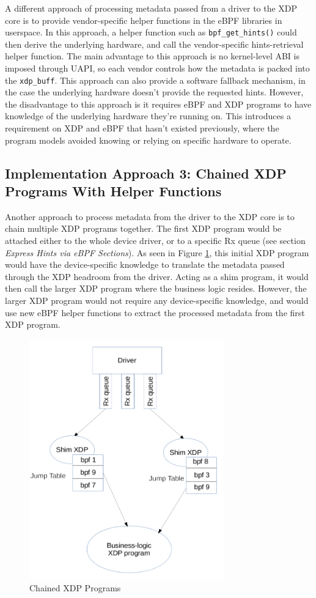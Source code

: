 \documentclass[letterpaper]{article}
\begin{document}
A different approach of processing metadata passed from a driver to the XDP core is to provide vendor-specific helper functions in the eBPF libraries in userspace. In this approach, a helper function such as {\small \texttt{bpf\_get\_hints()}} could then derive the underlying hardware, and call the vendor-specific hints-retrieval helper function. The main advantage to this approach is no kernel-level ABI is imposed through UAPI, so each vendor controls how the metadata is packed into the {\small \texttt{xdp\_buff}}. This approach can also provide a software fallback mechanism, in the case the underlying hardware doesn't provide the requested hints.
\newline
\indent However, the disadvantage to this approach is it requires eBPF and XDP programs to have knowledge of the underlying hardware they're running on. This introduces a requirement on XDP and eBPF that hasn't existed previously, where the program models avoided knowing or relying on specific hardware to operate.

\subsection{Implementation Approach 3: Chained XDP Programs With Helper Functions}

Another approach to process metadata from the driver to the XDP core is to chain multiple XDP programs together. The first XDP program would be attached either to the whole device driver, or to a specific Rx queue (see section \textit{Express Hints via eBPF Sections}). As seen in Figure \ref{xdp-chained-programs}, this initial XDP program would have the device-specific knowledge to translate the metadata passed through the XDP headroom from the driver. Acting as a shim program, it would then call the larger XDP program where the business logic resides. However, the larger XDP program would not require any device-specific knowledge, and would use new eBPF helper functions to extract the processed metadata from the first XDP program.

\begin{figure}[h]
\includegraphics[width=3.31in]{xdp-chained-programs.png}
\caption{Chained XDP Programs}
\label{xdp-chained-programs}
\end{figure}
\end{document}
